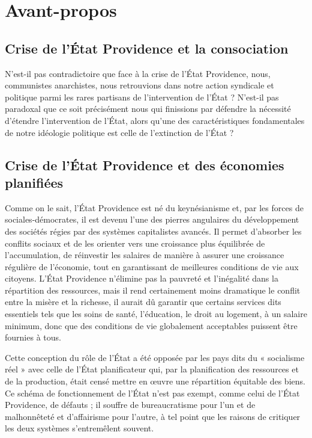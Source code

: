 \chapter{Avant-propos}

\section*{Crise de l'État Providence et la consociation}

N'est-il pas contradictoire que face à la crise de l'État Providence, nous, communistes anarchistes, nous retrouvions dans notre action syndicale et politique parmi les rares partisans de l'intervention de l'État ? N'est-il pas paradoxal que ce soit précisément nous qui finissions par défendre la nécessité d'étendre l'intervention de l'État, alors qu'une des caractéristiques fondamentales de notre idéologie politique est celle de l'extinction de l'État ?

\section*{Crise de l'État Providence et des économies planifiées}

Comme on le sait, l'État Providence est né du keynésianisme et, par les forces de sociales-démocrates, il est devenu l'une des pierres angulaires du développement des sociétés régies par des systèmes capitalistes avancés. Il permet d'absorber les conflits sociaux et de les orienter vers une croissance plus équilibrée de l'accumulation, de réinvestir les salaires de manière à assurer une croissance régulière de l'économie, tout en garantissant de meilleures conditions de vie aux citoyens. L'État Providence n'élimine pas la pauvreté et l'inégalité dans la répartition des ressources, mais il rend certainement moins dramatique le conflit entre la misère et la richesse, il aurait dû garantir que certains services dits essentiels tels que les soins de santé, l'éducation, le droit au logement, à un salaire minimum, donc que des conditions de vie globalement acceptables puissent être fournies à tous.

Cette conception du rôle de l'État a été opposée par les pays dits du « socialisme réel » avec  celle de l’État planificateur qui, par la planification des ressources et de la production, était censé mettre en œuvre une répartition équitable des biens. Ce schéma de fonctionnement de l'État n'est pas exempt, comme celui de l'État Providence, de défauts ; il souffre de bureaucratisme pour l'un et de malhonnêteté et d'affairisme pour l'autre, à tel point que les raisons de critiquer les deux systèmes s'entremêlent souvent.

